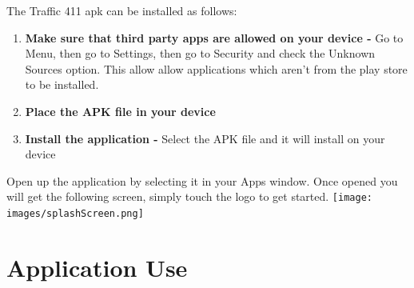 \documentclass[a4paper,12pt]{article}
\begin{document}
The Traffic 411 apk can be installed as follows:
\begin{enumerate}
\item \textbf{Make sure that third party apps are allowed on your device -} Go to Menu, then go to Settings, then go to Security and check the Unknown Sources option. This allow allow applications which aren't from the play store to be installed.
\item \textbf{Place the APK file in your device} 
\item \textbf{Install the application -} Select the APK file and it will install on your device
\end{enumerate}

Open up the application by selecting it in your Apps window. Once opened you will get the following screen, simply touch the logo to get started.
\texttt{[image: images/splashScreen.png]}

\section{Application Use}
\end{document}
